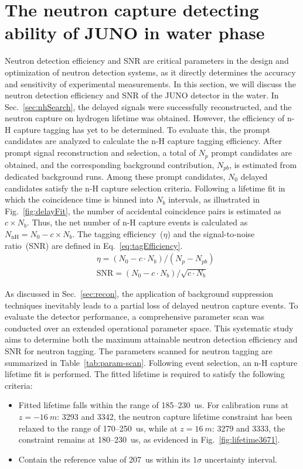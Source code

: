\section{The neutron capture detecting ability of JUNO in water phase}
\label{sec:tagEfficiency}
Neutron detection efficiency and SNR are critical parameters in the design and optimization of neutron detection systems, as it directly determines the accuracy and sensitivity of experimental measurements. In this section, we will discuss the neutron detection efficiency and SNR of the JUNO detector in the water.
In Sec.~\ref{sec:nhSearch}, the delayed signals were successfully reconstructed, and the neutron capture on hydrogen lifetime was obtained.
However, the efficiency of n-H capture tagging has yet to be determined.
To evaluate this, the prompt candidates are analyzed to calculate the n-H capture tagging efficiency.
After prompt signal reconstruction and selection, a total of $N_p$ prompt candidates are obtained, and the corresponding background contribution, $N_{pb}$, is estimated from dedicated background runs.
Among these prompt candidates, $N_{0}$ delayed candidates satisfy the n-H capture selection criteria.
Following a lifetime fit in which the coincidence time is binned into $N_b$ intervals, as illustrated in Fig.~\ref{fig:delayFit}, the number of accidental coincidence pairs is estimated as $c \times N_b$.
Thus, the net number of n-H capture events is calculated as $N_{\mathrm{nH}} = N_0 - c \times N_{b}$.
The tagging efficiency~($\eta$) and the signal-to-noise ratio~(SNR) are defined in Eq.~\eqref{eq:tagEfficiency}.
\begin{equation}
	\label{eq:tagEfficiency}
	\begin{aligned}
		 & \eta = (N_0 - c \cdot N_b) / (N_p - N_{pb})           \\
		 & \text{SNR} = (N_0 - c \cdot N_b) / \sqrt{c \cdot N_b}
	\end{aligned}
\end{equation}

As discussed in Sec.~\ref{sec:recon}, the application of background suppression techniques inevitably leads to a partial loss of delayed neutron capture events.
To evaluate the detector performance, a comprehensive parameter scan was conducted over an extended operational parameter space.
This systematic study aims to determine both the maximum attainable neutron detection efficiency and SNR for neutron tagging.
The parameters scanned for neutron tagging are summarized in Table~\ref{tab:param-scan}.
Following event selection, an n-H capture lifetime fit is performed.
The fitted lifetime is required to satisfy the following criteria:
\begin{itemize}
	\item Fitted lifetime falls within the range of 185--\SI{230}{us}. For calibration runs at $z=\SI{-16}{m}$: 3293 and 3342, the neutron capture lifetime constraint has been relaxed to the range of 170--\SI{250}{us}, while at $z=\SI{16}{m}$: 3279 and 3333, the constraint remains at 180--\SI{230}{us}, as evidenced in Fig.~\ref{fig:lifetime3671}.
	\item Contain the reference value of \SI{207}{us} within its $1\sigma$ uncertainty interval.
\end{itemize}

